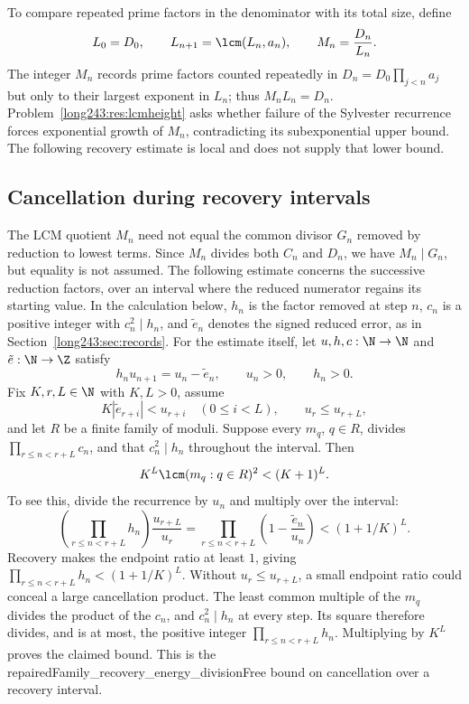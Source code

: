 To compare repeated prime factors in the denominator with its total
size, define
\[
 L_0=D_0,\qquad L_{n+1}=\lcm(L_n,a_n),\qquad M_n=\frac{D_n}{L_n}.
\]
The integer $M_n$ records prime factors counted repeatedly in
$D_n=D_0\prod_{j<n}a_j$ but only to their largest exponent in $L_n$;
thus $M_nL_n=D_n$. Problem~\ref{long243:res:lcmheight} asks whether
failure of the Sylvester recurrence forces exponential growth of $M_n$,
contradicting its subexponential upper bound. The following recovery
estimate is local and does not supply that lower bound.

\subsection{Cancellation during recovery intervals}

The LCM quotient $M_n$ need not equal the common divisor $G_n$ removed
by reduction to lowest terms. Since $M_n$ divides both $C_n$ and $D_n$,
we have $M_n\mid G_n$, but equality is not assumed. The following
estimate concerns the successive reduction factors, over an interval
where the reduced numerator regains its starting value.
In the calculation below, $h_n$ is the factor removed at step $n$,
$c_n$ is a positive integer with $c_n^2\mid h_n$, and $\tilde e_n$
denotes the signed reduced error, as in Section~\ref{long243:sec:records}.
For the estimate itself, let $u,h,c:\N\to\N$ and $\tilde e:\N\to\Z$ satisfy
\[
 h_nu_{n+1}=u_n-\tilde e_n,
 \qquad u_n>0,
 \qquad h_n>0.
\]
Fix $K,r,L\in\N$ with $K,L>0$, assume
\[
 K|\tilde e_{r+i}|<u_{r+i}\quad(0\le i<L),
 \qquad u_r\le u_{r+L},
\]
and let $R$ be a finite family of moduli.  Suppose every $m_q$, $q\in R$,
divides $\prod_{r\le n<r+L}c_n$, and that
$c_n^2\mid h_n$ throughout the interval.  Then
\begin{equation}\label{long243:eq:repair-entropy}
 K^L\lcm(m_q:q\in R)^2<(K+1)^L.
\end{equation}
To see this, divide the recurrence by $u_n$ and multiply over the interval:
\[
 \left(\prod_{r\le n<r+L}h_n\right)\frac{u_{r+L}}{u_r}
 =\prod_{r\le n<r+L}\left(1-\frac{\tilde e_n}{u_n}\right)
 <(1+1/K)^L.
\]
Recovery makes the endpoint ratio at least $1$, giving
$\prod_{r\le n<r+L}h_n<(1+1/K)^L$. Without $u_r\le u_{r+L}$,
a small endpoint ratio could conceal a large cancellation product.
The least common multiple of the $m_q$ divides the product of the
$c_n$, and $c_n^2\mid h_n$ at every step. Its square therefore divides,
and is at most, the positive integer $\prod_{r\le n<r+L}h_n$.
Multiplying by $K^L$ proves the claimed bound.
This is the
      {repairedFamily_recovery_energy_divisionFree}
      {bound on cancellation over a recovery interval}.

